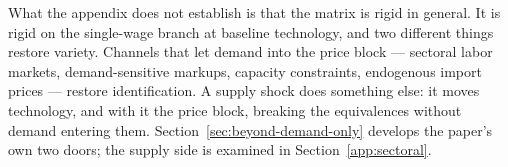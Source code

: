 What the appendix does not establish is that the matrix is rigid in general.
It is rigid on the single-wage branch at baseline technology, and two different
things restore variety. Channels that let demand into the price block ---
sectoral labor markets, demand-sensitive markups, capacity constraints,
endogenous import prices --- restore identification. A supply shock does
something else: it moves technology, and with it the price block, breaking the equivalences without demand entering them.
Section~\ref{sec:beyond-demand-only} develops the paper's own two doors; the
supply side is examined in Section~\ref{app:sectoral}.
